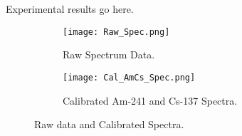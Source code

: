 Experimental results go here.





\begin{figure}[h!]
  \begin{subfigure}[b]{0.6\linewidth}
    \texttt{[image: Raw\_Spec.png]}
    \caption{Raw Spectrum Data.}
  \end{subfigure}
  \begin{subfigure}[b]{0.6\linewidth}
    \texttt{[image: Cal\_AmCs\_Spec.png]}
    \caption{Calibrated Am-241 and Cs-137 Spectra.}
  \end{subfigure}
  \caption{Raw data and Calibrated Spectra.}

\end{figure}

